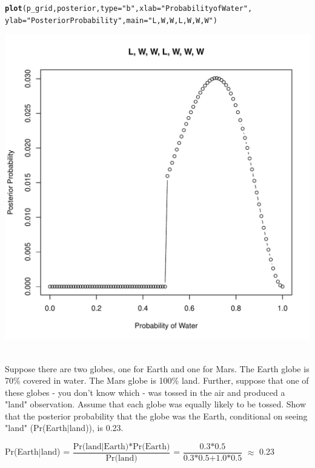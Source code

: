 \documentclass[12pt]{article}\usepackage[]{graphicx}\usepackage[]{color}
\makeatletter
\def\maxwidth{ %
  \ifdim\Gin@nat@width>\linewidth
    \linewidth
  \else
    \Gin@nat@width
  \fi
}
\newcommand{\hlstr}[1]{\textcolor[rgb]{0.192,0.494,0.8}{#1}}%
\newcommand{\hlstd}[1]{\textcolor[rgb]{0.345,0.345,0.345}{#1}}%
\newcommand{\hlkwc}[1]{\textcolor[rgb]{0.333,0.667,0.333}{#1}}%
\newcommand{\hlkwd}[1]{\textcolor[rgb]{0.737,0.353,0.396}{\textbf{#1}}}%
\newenvironment{kframe}{%
 \def\at@end@of@kframe{}%
 \ifinner\ifhmode%
  \def\at@end@of@kframe{\end{minipage}}%
  \begin{minipage}{\columnwidth}%
 \fi\fi%
 \def\FrameCommand##1{\hskip\@totalleftmargin \hskip-\fboxsep
 \colorbox{shadecolor}{##1}\hskip-\fboxsep
     \hskip-\linewidth \hskip-\@totalleftmargin \hskip\columnwidth}%
 \MakeFramed {\advance\hsize-\width
   \@totalleftmargin\z@ \linewidth\hsize
   \@setminipage}}%
 {\par\unskip\endMakeFramed%
 \at@end@of@kframe}
\newenvironment{knitrout}{}{} %
\newenvironment{problem}[2][Problem]{\begin{trivlist}
\item[\hskip \labelsep {\bfseries #1}\hskip \labelsep {\bfseries #2.}]}{\end{trivlist}}
\newcommand{\textfrac}[2]{\dfrac{\text{#1}}{\text{#2}}}
\makeatother
\begin{document}
\begin{knitrout}
\begin{kframe}
\begin{alltt}
\hlkwd{plot}\hlstd{(p_grid, posterior,} \hlkwc{type} \hlstd{=} \hlstr{"b"}\hlstd{,} \hlkwc{xlab} \hlstd{=} \hlstr{"Probability of Water"}\hlstd{,}
     \hlkwc{ylab} \hlstd{=} \hlstr{"Posterior Probability"}\hlstd{,} \hlkwc{main} \hlstd{=} \hlstr{"L, W, W, L, W, W, W"}\hlstd{)}
\end{alltt}
\end{kframe}
\includegraphics[width=\maxwidth]{figure/unnamed-chunk-3-3} 

\end{knitrout}

\begin{problem}{2M3}
\text{}\\
Suppose there are two globes, one for Earth and one for Mars. The Earth globe is 70\% covered in water. The Mars globe is 100\% land. Further, suppose that one of these globes - you don't know which - was tossed in the air and produced a "land" observation. Assume that each globe was equally likely to be tossed. Show that the posterior probability that the globe was the Earth, conditional on seeing "land" (Pr(Earth$\vert$land)), is 0.23.
\end{problem}

Pr(Earth$\vert$land) = $\textfrac{Pr(land$\vert$Earth)*Pr(Earth)}{Pr(land)}$ = $\textfrac{0.3*0.5}{0.3*0.5+1.0*0.5}$ $\approx$ 0.23
\end{document}
